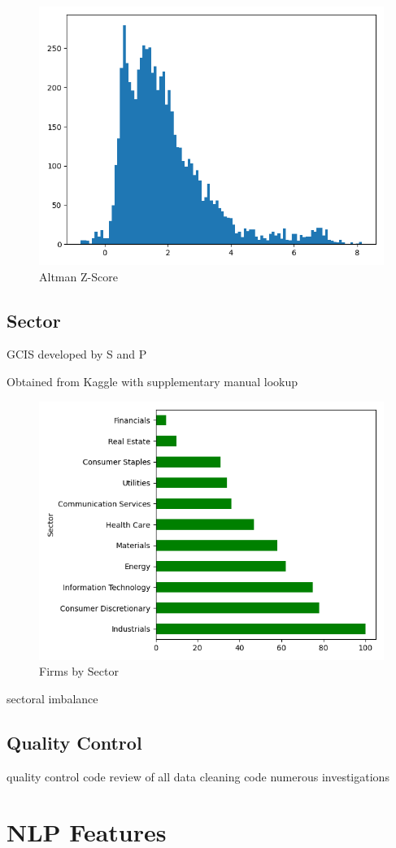 \documentclass{article}
\begin{document}
    \begin{figure}[h!]
		\centering
        \caption{Altman Z-Score}
        \includegraphics[width=0.5\linewidth,keepaspectratio=true]{../Output/All Data EDA/Tabular EDA/altman_z_score_all_data_no_title.png}
	\end{figure}    

    \subsection*{Sector}

    GCIS developed by S and P

    Obtained from Kaggle with supplementary manual lookup

    \begin{figure}[h!]
		\centering
        \caption{Firms by Sector}
        \includegraphics[width=0.5\linewidth,keepaspectratio=true]{../Output/All Data EDA/Tabular EDA/all_data_fixed_quarter_dates_firms_by_sector_no_title.png}
	\end{figure}

    sectoral imbalance    

    \subsection*{Quality Control}

    quality control
    code review of all data cleaning code
    numerous investigations

    \section*{NLP Features}
\end{document}
